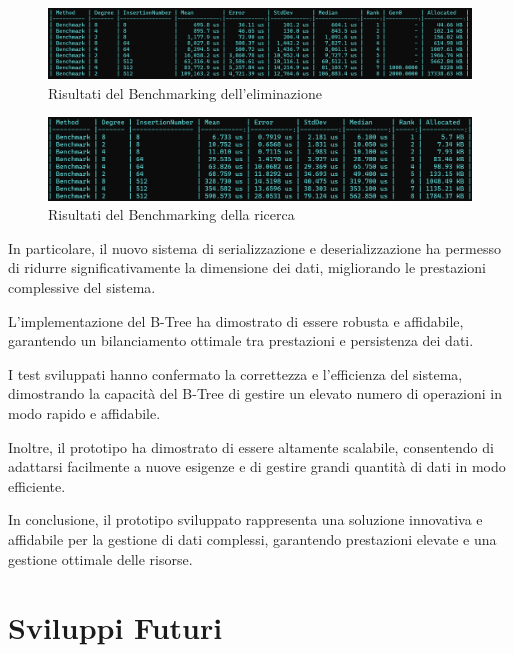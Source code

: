 \documentclass[12pt,a4paper,openright,twoside]{book}
\begin{document}
        \begin{figure} [h]
            \centering
            \includegraphics[width=1\linewidth]{figures/BenchmarkDelete.png}
            \caption{Risultati del Benchmarking dell'eliminazione}
            \label{fig:benchmark}
        \end{figure}

        \begin{figure} [h]
            \centering
            \includegraphics[width=1\linewidth]{figures/BenchmarkSearch.png}
            \caption{Risultati del Benchmarking della ricerca}
            \label{fig:benchmark}
        \end{figure}

        In particolare, il nuovo sistema di serializzazione e deserializzazione ha permesso di ridurre significativamente la dimensione dei dati, migliorando le prestazioni complessive del sistema.

        L'implementazione del B-Tree ha dimostrato di essere robusta e affidabile, garantendo un bilanciamento ottimale tra prestazioni e persistenza dei dati.

        I test sviluppati hanno confermato la correttezza e l'efficienza del sistema, dimostrando la capacità del B-Tree di gestire un elevato numero di operazioni in modo rapido e affidabile.

        Inoltre, il prototipo ha dimostrato di essere altamente scalabile, consentendo di adattarsi facilmente a nuove esigenze e di gestire grandi quantità di dati in modo efficiente.

        In conclusione, il prototipo sviluppato rappresenta una soluzione innovativa e affidabile per la gestione di dati complessi, garantendo prestazioni elevate e una gestione ottimale delle risorse.

    \section{Sviluppi Futuri}
\end{document}
